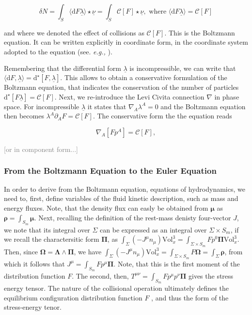 \documentclass[11pt,a4paper,headinclude=true,DIV=14,BCOR=8mm,chapterprefix,listof=totoc,twoside,openright,abstracton]{scrbook}
\newcommand{\gray}[1]{\textcolor{gray}{#1}}
\begin{document}
\begin{equation}
\delta N = \int_S\langle\text{d}F\underline{\lambda}\rangle\star\underline{\nu} = \int_S\mathcal{C}[F]\star\underline{\nu}, \text{ where } \langle\text{d}F\underline{\lambda}\rangle = \mathcal{C}[F]
\end{equation}

and where we denoted the effect of collisions as $\mathcal{C}[F]$. This is the Boltzmann equation. It can be written explicitly in coordinate form, in the coordinate system adopted to the equation (see. \textit{e.g.,} \cite{Cercignani:2002}). 

Remembering that the differential form $\underline{\lambda}$ is incompressible, we can write that $\langle\text{d}F,\underline{\lambda}\rangle = \text{d}^{\star}[F,\underline{\lambda}]$. This allows to obtain a conservative formulation of the Boltzmann equation, that indicates the conservation of the number of particles \cite{Cardall:2002bp} $\text{d}^{\star}[F\underline{\lambda}] = \mathcal{C}[F]$. Next, we re-introduce the Levi Civita connection $\nabla$ in phase space. For incompressible $\underline{\lambda}$ it states that $\nabla_A\lambda^A=0$ and the Boltzmann equation then becomes $\lambda^A\partial_A F=\mathcal{C}[F]$. The conservative form the the equation reads 

\begin{equation}
\nabla_A[Fp^{A}] = \mathcal{C}[F],
\label{eq:theory:liouvilletheorem}
\end{equation}

\gray{[or in component form...]}

\subsubsection{From the Boltzmann Equation to the Euler Equation}

In order to derive from the Boltzmann equation, equations of hydrodynamics, we need to, first, define variables of the fluid kinetic description, such as mass and energy fluxes. Note, that the density flux can easly be obtained from $\boldsymbol{\mu}$ as $\boldsymbol{\rho} = \int_{S_m} \boldsymbol{\mu}$. Next, recalling the definition of the rest-mass denisty four-vector $J$, we note that its integral over $\Sigma$ can be expressed as an integral over $\Sigma\times S_{m}$, if we recall the charactersitic form $\boldsymbol{\Pi}$, as $\int_{\Sigma}(-J^{\mu}n_{\mu})\text{Vol}_x ^3 = \int_{\Sigma\times S_{m}} Fp^0\boldsymbol{\Pi}\text{Vol}_x ^3$. Then, since $\boldsymbol{\Omega} = \boldsymbol{\Lambda} \wedge \boldsymbol{\Pi}$, we have $\int_{\Sigma}(-J^{\mu}n_{\mu})\text{Vol}_x ^3 = \int_{\Sigma\times S_{m}} F\boldsymbol{\Omega} = \int_{\Sigma}\boldsymbol{\rho}$, from which it follows that $J^{\mu} = \int_{S_m}Fp^{\mu}\boldsymbol{\Pi}$. Note, that this is the first moment of the distribution function $F$. The second, then, $T^{\mu\nu} = \int_{S_m} F p^{\mu}p^{\nu}\boldsymbol{\Pi}$ gives the stress energy tensor. The nature of the collisional operation ultimately defines the equilibrium configuration distribution function $F$ \cite{Cercignani:2002}, and thus the form of the stress-energy tenor.
\end{document}
